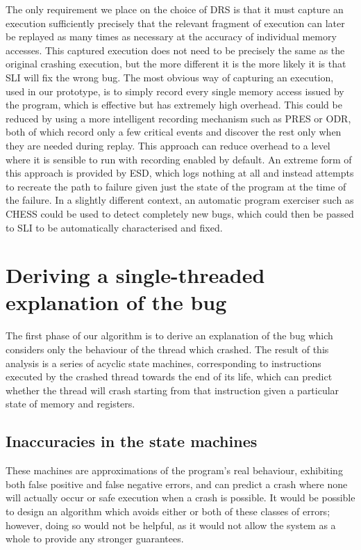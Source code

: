 \documentclass[10pt,twocolumn,preprint,natbib,authoryear]{sigplanconf}
\begin{document}
The only requirement we place on the choice of DRS is that it must
capture an execution sufficiently precisely that the relevant fragment
of execution can later be replayed as many times as necessary at the
accuracy of individual memory accesses.  This captured execution does
not need to be precisely the same as the original crashing execution,
but the more different it is the more likely it is that SLI will fix
the wrong bug.  The most obvious way of capturing an execution, used
in our prototype, is to simply record every single memory access
issued by the program, which is effective but has extremely high
overhead.  This could be reduced by using a more intelligent recording
mechanism such as PRES\cite{Park2009} or ODR\cite{Altekar2009}, both
of which record only a few critical events and discover the rest only
when they are needed during replay.  This approach can reduce overhead
to a level where it is sensible to run with recording enabled by
default.  An extreme form of this approach is provided by
ESD\cite{Zamfir2010}, which logs nothing at all and instead attempts
to recreate the path to failure given just the state of the program at
the time of the failure.  In a slightly different context, an
automatic program exerciser such as CHESS\cite{Musuvathi2008} could be
used to detect completely new bugs, which could then be passed to SLI
to be automatically characterised and fixed.

\section{Deriving a single-threaded explanation of the bug}

The first phase of our algorithm is to derive an explanation of the
bug which considers only the behaviour of the thread which crashed.
The result of this analysis is a series of acyclic state machines,
corresponding to instructions executed by the crashed thread towards
the end of its life, which can predict whether the thread will crash
starting from that instruction given a particular state of memory and
registers.

\subsection{Inaccuracies in the state machines}

These machines are approximations of the program's real behaviour,
exhibiting both false positive and false negative errors, and can
predict a crash where none will actually occur or safe execution when
a crash is possible.  It would be possible to design an algorithm
which avoids either or both of these classes of errors; however, doing
so would not be helpful, as it would not allow the system as a whole
to provide any stronger guarantees.
\end{document}
